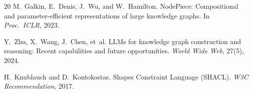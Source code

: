 \documentclass[a4paper,11pt]{article}
\theoremstyle{definition}
\begin{document}
\begin{thebibliography}{20}
M.~Galkin, E.~Denis, J.~Wu, and W.~Hamilton.
\newblock NodePiece: Compositional and parameter-efficient representations of large knowledge graphs.
\newblock In \textit{Proc.\ ICLR}, 2023.

Y.~Zhu, X.~Wang, J.~Chen, et~al.
\newblock LLMs for knowledge graph construction and reasoning: Recent capabilities and future opportunities.
\newblock \textit{World Wide Web}, 27(5), 2024.

H.~Knublauch and D.~Kontokostas.
\newblock Shapes Constraint Language (SHACL).
\newblock \textit{W3C Recommendation}, 2017.

\end{thebibliography}
\endgroup
\end{document}
